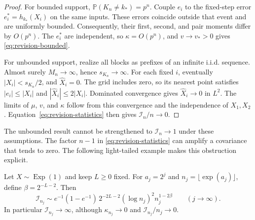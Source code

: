\begin{proof}
For bounded support, $\mathbb P(K_n\ne k_*)=p^n$.
Couple $e_i$ to the fixed-step error $e_i^*=h_{k_*}(X_i)$ on the same
inputs. These errors coincide outside that event and are uniformly bounded.
Consequently, their first, second, and pair moments differ by $O(p^n)$.
The $e_i^*$ are independent, so $\kappa=O(p^n)$, and $v\to v_*>0$
gives \eqref{eq:revision-bounded}.

For unbounded support, realize all blocks as prefixes of an infinite i.i.d.
sequence. Almost surely $M_n\to\infty$, hence $s_{K_n}\to\infty$.
For each fixed $i$, eventually $|X_i|<s_{K_n}/2$, and
$\widehat X_i=0$. The grid includes zero, so its nearest point satisfies
$|e_i|\le|X_i|$ and $|\widehat X_i|\le2|X_i|$. Dominated convergence
gives $\widehat X_i\to0$ in $L^2$. The limits of $\mu$, $v$, and
$\kappa$ follow from this convergence and the independence of $X_1,X_2$.
Equation~\eqref{eq:revision-statistics} then gives $\mathcal I_n/n\to0$.
\end{proof}

The unbounded result cannot be strengthened to $\mathcal I_n\to1$ under
these assumptions. The factor $n-1$ in
\eqref{eq:revision-statistics} can amplify a covariance that tends to zero.
The following light-tailed example makes this obstruction explicit.

\begin{theorem}
\label{thm:revision-exponential}
Let $X\sim\operatorname{Exp}(1)$ and keep $L\ge0$ fixed. For
$a_j=2^j$ and $n_j=\lfloor\exp(a_j)\rfloor$, define
$\beta=2^{-L-2}$. Then
\begin{equation}\label{eq:revision-exp-asymptotic}
 \mathcal I_{n_j}\sim
 e^{-1}(1-e^{-1})\,2^{-2L-2}
          (\log n_j)^2n_j^{1-2\beta}
 \qquad (j\to\infty).
\end{equation}
In particular $\mathcal I_{n_j}\to\infty$, although
$\kappa_{n_j}\to0$ and $\mathcal I_{n_j}/n_j\to0$.
\end{theorem}

